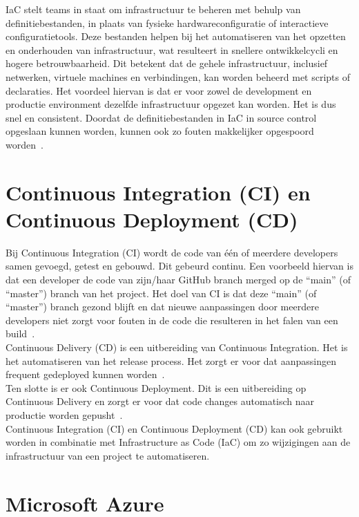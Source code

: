 IaC stelt teams in staat om infrastructuur te beheren met behulp van definitiebestanden, in plaats van fysieke hardwareconfiguratie of interactieve configuratietools. Deze bestanden helpen bij het automatiseren van het opzetten en onderhouden van infrastructuur, wat resulteert in snellere ontwikkelcycli en hogere betrouwbaarheid. Dit betekent dat de gehele infrastructuur, inclusief netwerken, virtuele machines en verbindingen, kan worden beheerd met scripts of declaraties. Het voordeel hiervan is dat er voor zowel de development en productie environment dezelfde infrastructuur opgezet kan worden. Het is dus snel en consistent. Doordat de definitiebestanden in IaC in source control opgeslaan kunnen worden, kunnen ook zo fouten makkelijker opgespoord worden~\autocite{Schults2024}.

\section{Continuous Integration (CI) en Continuous Deployment (CD)}

Bij Continuous Integration (CI) wordt de code van één of meerdere developers samen gevoegd, getest en gebouwd. Dit gebeurd continu. Een voorbeeld hiervan is dat een developer de code van zijn/haar GitHub branch merged op de ``main'' (of ``master'') branch van het project. Het doel van CI is dat deze ``main'' (of ``master'') branch gezond blijft en dat nieuwe aanpassingen door meerdere developers niet zorgt voor fouten in de code die resulteren in het falen van een build~\autocite{Jackson2020}.\\

Continuous Delivery (CD) is een uitbereiding van Continuous Integration. Het is het automatiseren van het release process. Het zorgt er voor dat aanpassingen frequent gedeployed kunnen worden~\autocite{Jackson2020}.\\

Ten slotte is er ook Continuous Deployment. Dit is een uitbereiding op Continuous Delivery en zorgt er voor dat code changes automatisch naar productie worden gepusht~\autocite{Jackson2020}.\\

Continuous Integration (CI) en Continuous Deployment (CD) kan ook gebruikt worden in combinatie met Infrastructure as Code (IaC) om zo wijzigingen aan de infrastructuur van een project te automatiseren.

\section{Microsoft Azure}

